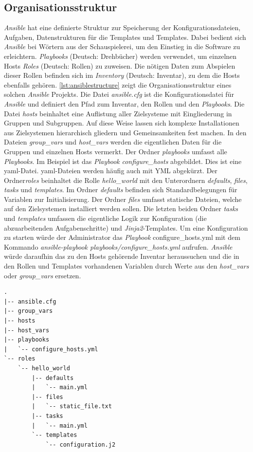 \documentclass[titlepage]{report}
\begin{document}
\subsection*{Organisationsstruktur}
\emph{Ansible} hat eine definierte Struktur zur Speicherung der
Konfigurationsdateien, Aufgaben, Datenstrukturen für die Templates und
Templates. Dabei bedient sich \emph{Ansible} bei Wörtern aus der
Schauspielerei, um den Einstieg in die Software zu erleichtern.
\emph{Playbooks} (Deutsch: Drehbücher) werden verwendet, um einzelnen
Hosts \emph{Roles} (Deutsch: Rollen) zu zuweisen. Die nötigen Daten zum
Abspielen dieser Rollen befinden sich im \emph{Inventory} (Deutsch:
Inventar), zu dem die Hosts ebenfalls gehören. 
\autoref{lst:ansiblestructure} zeigt die Organisationsstruktur eines
solchen \emph{Ansible} Projekts. Die Datei \emph{ansible.cfg} ist die
Konfigurationsdatei für \emph{Ansible} und definiert den Pfad zum
Inventar, den Rollen und den \emph{Playbooks}. Die Datei \emph{hosts}
beinhaltet eine Auflistung aller Zielsysteme mit Eingliederung in
Gruppen und Subgruppen. Auf diese Weise lassen sich komplexe
Installationen aus Zielsystemen hierarchisch gliedern und
Gemeinsamkeiten fest machen. In den Dateien \emph{group\_vars} und
\emph{host\_vars} werden die eigentlichen Daten für die Gruppen und
einzelnen Hosts vermerkt. Der Ordner \emph{playbooks} umfasst alle
\emph{Playbooks}. Im Beispiel ist das \emph{Playbook}
\emph{configure\_hosts} abgebildet. Dies ist eine \gls{yaml}\hyp{}Datei.
\gls{yaml}\hyp{}Dateien werden häufig auch mit YML abgekürzt. Der
Ordner\emph{roles} beinhaltet die Rolle \emph{hello\_world} mit den
Unterordnern \emph{defaults}, \emph{files}, \emph{tasks} und
\emph{templates}. Im Ordner \emph{defaults} befinden sich
Standardbelegungen für Variablen zur Initialisierung. Der Ordner
\emph{files} umfasst statische Dateien, welche auf den Zielsystemen
installiert werden sollen. Die letzten beiden Ordner \emph{tasks} und
\emph{templates} umfassen die eigentliche Logik zur Konfiguration (die
abzuarbeitenden Aufgabenschritte) und \emph{Jinja2}\hyp{}Templates. Um
eine Konfiguration zu starten würde der Administrator das
\emph{Playbook} {configure\_hosts.yml} mit dem Kommando
\emph{ansible-playbook playbooks/configure\_hosts.yml} aufrufen.
\emph{Ansible} würde daraufhin das zu den Hosts gehörende Inventar
heraussuchen und die in den Rollen und Templates vorhandenen Variablen
durch Werte aus den \emph{host\_vars} oder \emph{group\_vars} ersetzen.
\begin{minipage}{\linewidth}
\begin{lstlisting}[caption={Organisationsstruktur eines Ansible
Projekts},label={lst:ansiblestructure}]
.
|-- ansible.cfg
|-- group_vars
|-- hosts
|-- host_vars
|-- playbooks
|   `-- configure_hosts.yml
`-- roles
    `-- hello_world
        |-- defaults
        |   `-- main.yml
        |-- files
        |   `-- static_file.txt
        |-- tasks
        |   `-- main.yml
        `-- templates
            `-- configuration.j2
\end{lstlisting}
\end{minipage}
\end{document}
